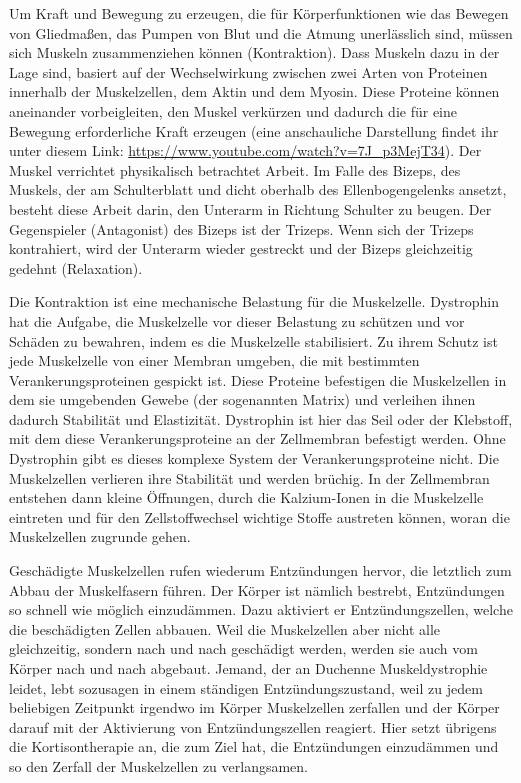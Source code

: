 \documentclass[fontsize=14pt,a4paper,headinclude,DIV=calc,automark]{scrbook}
\begin{document}
Um Kraft und Bewegung zu erzeugen, die für Körperfunktionen wie das Bewegen von Gliedmaßen, das Pumpen von Blut und die Atmung unerlässlich sind, müssen sich Muskeln zusammenziehen können (Kontraktion). Dass Muskeln dazu in der Lage sind, basiert auf der Wechselwirkung zwischen zwei Arten von Proteinen innerhalb der Muskelzellen, dem Aktin und dem Myosin. Diese Proteine können aneinander vorbeigleiten, den Muskel verkürzen und dadurch die für eine Bewegung erforderliche Kraft erzeugen (eine anschauliche Darstellung findet ihr unter diesem Link: \url{https://www.youtube.com/watch?v=7J_p3MejT34}). Der Muskel verrichtet physikalisch betrachtet Arbeit. Im Falle des Bizeps, des Muskels, der am Schulterblatt und dicht oberhalb des Ellenbogengelenks ansetzt, besteht diese Arbeit darin, den Unterarm in Richtung Schulter zu beugen. Der Gegenspieler (Antagonist) des Bizeps ist der Trizeps. Wenn sich der Trizeps kontrahiert, wird der Unterarm wieder gestreckt und der Bizeps gleichzeitig gedehnt (Relaxation).

Die Kontraktion ist eine mechanische Belastung für die Muskelzelle. Dystrophin hat die Aufgabe, die Muskelzelle vor dieser Belastung zu schützen und vor Schäden zu bewahren, indem es die Muskelzelle stabilisiert. Zu ihrem Schutz ist jede Muskelzelle von einer Membran umgeben, die mit bestimmten Verankerungsproteinen gespickt ist. Diese Proteine befestigen die Muskelzellen in dem sie umgebenden Gewebe (der sogenannten Matrix) und verleihen ihnen dadurch Stabilität und Elastizität. Dystrophin ist hier das Seil oder der Klebstoff, mit dem diese Verankerungsproteine an der Zellmembran befestigt werden. Ohne Dystrophin gibt es dieses komplexe System der Verankerungsproteine nicht. Die Muskelzellen verlieren ihre Stabilität und werden brüchig. In der Zellmembran entstehen dann kleine Öffnungen, durch die Kalzium-Ionen in die Muskelzelle eintreten und für den Zellstoffwechsel wichtige Stoffe austreten können, woran die Muskelzellen zugrunde gehen.

Geschädigte Muskelzellen rufen wiederum Entzündungen hervor, die letztlich zum Abbau der Muskelfasern führen. Der Körper ist nämlich bestrebt, Entzündungen so schnell wie möglich einzudämmen. Dazu aktiviert er Entzündungszellen, welche die beschädigten Zellen abbauen. Weil die Muskelzellen aber nicht alle gleichzeitig, sondern nach und nach geschädigt werden, werden sie auch vom Körper nach und nach abgebaut. Jemand, der an Duchenne Muskeldystrophie leidet, lebt sozusagen in einem ständigen Entzündungszustand, weil zu jedem beliebigen Zeitpunkt irgendwo im Körper Muskelzellen zerfallen und der Körper darauf mit der Aktivierung von Entzündungszellen reagiert. Hier setzt übrigens die Kortisontherapie an, die zum Ziel hat, die Entzündungen einzudämmen und so den Zerfall der Muskelzellen zu verlangsamen.
\end{document}

